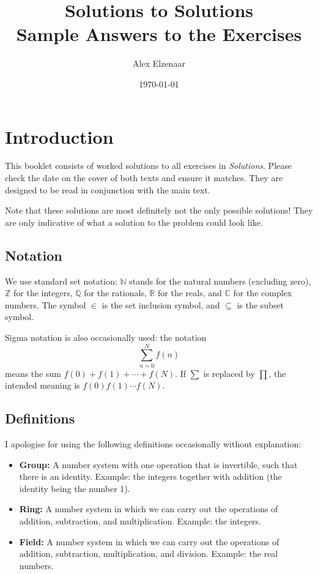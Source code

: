 \documentclass[a4paper,10pt]{article}
\title{\color{Emerald}Solutions to Solutions\\\small{Sample Answers to the Exercises}}
\author{Alex Elzenaar}%
\date{\today}
\begin{document}
\maketitle
\tableofcontents

\clearpage
\section{Introduction}
This booklet consists of worked solutions to all exercises in \textit{Solutions}. Please
check the date on the cover of both texts and ensure it matches. They are designed to be
read in conjunction with the main text.

Note that these solutions are most definitely not the only possible solutions! They are only
indicative of what a solution to the problem could look like.

\subsection*{Notation}
We use standard set notation: $ \mathbb{N} $ stands for the natural numbers (excluding zero), $ \mathbb{Z} $ for
the integers, $ \mathbb{Q} $ for the rationals, $ \mathbb{R} $ for the reals, and $ \mathbb{C} $ for the complex
numbers. The symbol $ \in $ is the set inclusion symbol, and $ \subseteq $ is the subset symbol.

Sigma notation is also occasionally used: the notation
\begin{displaymath}
  \sum^{N}_{n = 0} f(n)
\end{displaymath}
means the sum $ f(0) + f(1) + \cdots + f(N) $. If $ \sum $ is replaced by $ \prod $, the intended meaning is $ f(0) f(1) \cdots f(N) $.

\subsection*{Definitions}
I apologise for using the following definitions occasionally without explanation:
\begin{itemize}
  \item \textbf{Group:} A number system with one operation that is invertible, such that there is an identity. Example: the integers
                        together with addition (the identity being the number 1).
  \item \textbf{Ring:}  A number system in which we can carry out the operations of addition, subtraction, and multiplication. Example: the integers.
  \item \textbf{Field:} A number system in which we can carry out the operations of addition, subtraction, multiplication, and division. Example: the real
                        numbers.
\end{itemize}
\end{document}
